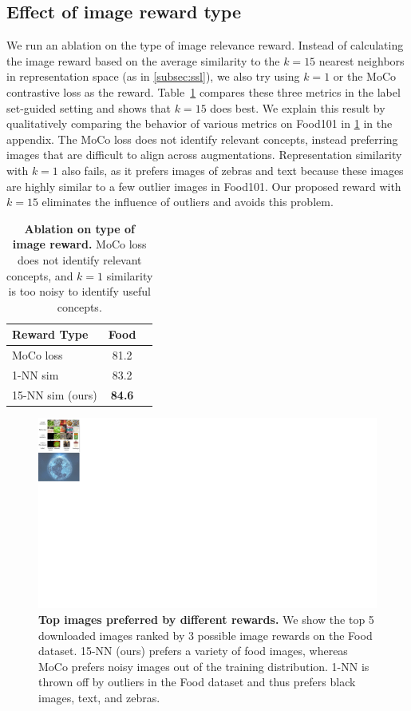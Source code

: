 \subsection{Effect of image reward type}
\label{subsec:reward_analysis}
We run an ablation on the type of image relevance reward. Instead of calculating the image reward based on the average similarity to the $k=15$ nearest neighbors in representation space (as in \cref{subsec:ssl}), we also try using $k=1$ or the MoCo contrastive loss as the reward. Table~\ref{tab:image_reward} compares these three metrics in the label set-guided setting and shows that $k=15$ does best. We explain this result by qualitatively comparing the behavior of various metrics on Food101 in \cref{fig:reward_ranking} in the appendix. The MoCo loss does not identify relevant concepts, instead preferring images that are difficult to align across augmentations. Representation similarity with $k=1$ also fails, as it prefers images of zebras and text because these images are highly similar to a few outlier images in Food101. Our proposed reward with $k=15$ eliminates the influence of outliers and avoids this problem.

\begin{table}[h]
    \centering
    \begin{tabular}{lcc}
        \toprule
        Reward Type & Food \\
        \midrule
        MoCo loss & 81.2 \\
        1-NN sim  & 83.2 \\
        15-NN sim (ours) & \textbf{84.6} \\
        \bottomrule
    \end{tabular}
    \caption{\textbf{Ablation on type of image reward.}
    MoCo loss does not identify relevant concepts, and $k=1$ similarity is too noisy to identify useful concepts. }
    \label{tab:image_reward}
\end{table}

\begin{figure}[h]
    \centering
    \includegraphics[width=0.5\linewidth]{figures/reward_ranking.pdf}
    \caption{\textbf{Top images preferred by different rewards.} We show the top 5 downloaded images ranked by 3 possible image rewards on the Food dataset. 15-NN (ours) prefers a variety of food images, whereas MoCo prefers noisy images out of the training distribution. 1-NN is thrown off by outliers in the Food dataset and thus prefers black images, text, and zebras.}
    \label{fig:reward_ranking}
\end{figure}

